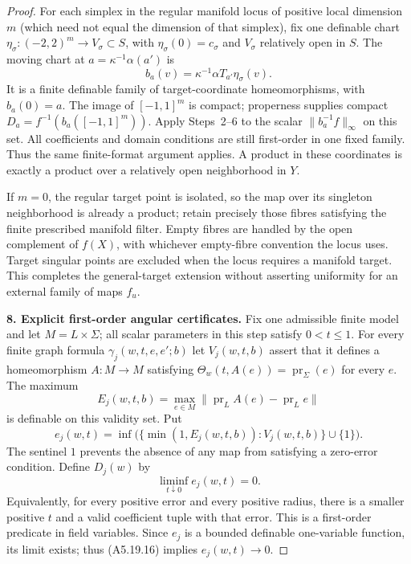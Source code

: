 \begin{proof}
For each simplex in the regular manifold locus of positive local dimension
$m$ (which need not equal the dimension of that simplex), fix one definable chart
$\eta_\sigma:(-2,2)^m\to V_\sigma\subset S$, with
$\eta_\sigma(0)=c_\sigma$ and $V_\sigma$ relatively open in $S$.
The moving chart at $a=\kappa^{-1}\alpha(a')$ is
\[
 b_a(v)=\kappa^{-1}\alpha T_{a'}\eta_\sigma(v).
 \tag{A5.19.14}
\]
It is a finite definable family of target-coordinate homeomorphisms,
with $b_a(0)=a$. The image of $[-1,1]^m$ is compact; properness supplies
compact $D_a=f^{-1}(b_a([-1,1]^m))$. Apply Steps~2--6 to the scalar
$\|b_a^{-1}f\|_\infty$ on this set. All coefficients and domain
conditions are still first-order in one fixed family. Thus the same
finite-format argument applies. A product in these coordinates is
exactly a product over a relatively open neighborhood in $Y$.

If $m=0$, the regular target point is isolated, so the map over its
singleton neighborhood is already a product; retain precisely those
fibres satisfying the finite prescribed manifold filter. Empty fibres
are handled by the open complement of $f(X)$, with whichever empty-fibre
convention the locus uses. Target singular points are excluded when the
locus requires a manifold target. This completes the general-target
extension without asserting uniformity for an external family of maps
$f_u$.

\textbf{8. Explicit first-order angular certificates.}\quad
Fix one admissible finite model and let $M=L\times\Sigma$; all scalar
parameters in this step satisfy $0<t\le1$. For every
finite graph formula $\gamma_j(w,t,e,e';b)$ let $V_j(w,t,b)$ assert that
it defines a homeomorphism $A:M\to M$ satisfying
$\Theta_w(t,A(e))=\operatorname{pr}_\Sigma(e)$ for every $e$.
The maximum
\[
 E_j(w,t,b)=\max_{e\in M}
 \|\operatorname{pr}_L A(e)-\operatorname{pr}_L e\|
\]
is definable on this validity set. Put
\[
 e_j(w,t)=\inf\bigl(\{\min(1,E_j(w,t,b)):V_j(w,t,b)\}\cup\{1\}\bigr).
 \tag{A5.19.15}
\]
The sentinel $1$ prevents the absence of any map from satisfying a
zero-error condition. Define $D_j(w)$ by
\[
 \liminf_{t\downarrow0}e_j(w,t)=0.
 \tag{A5.19.16}
\]
Equivalently, for every positive error and every positive radius, there
is a smaller positive $t$ and a valid coefficient tuple with that error.
This is a first-order predicate in field variables. Since $e_j$ is a
bounded definable one-variable function, its limit exists; thus (A5.19.16)
implies $e_j(w,t)\to0$.


\end{proof}
